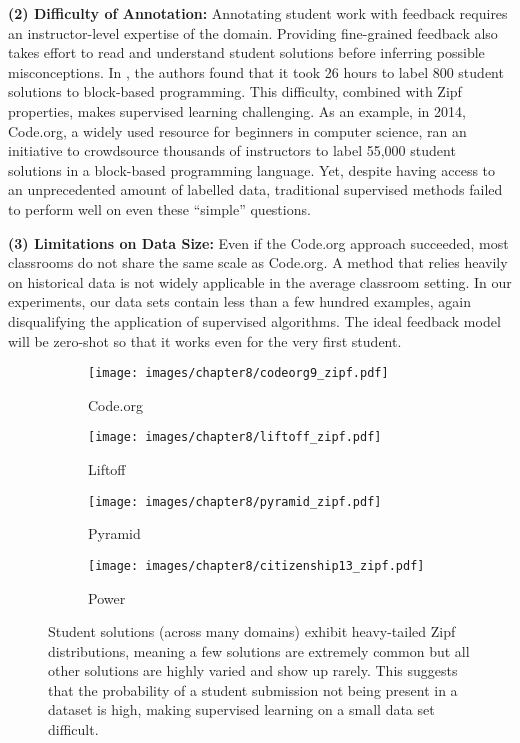 \noindent\textbf{(2) Difficulty of Annotation:} Annotating student work with feedback requires an instructor-level expertise of the domain. Providing fine-grained feedback also takes effort to read and understand student solutions before inferring possible misconceptions. In \cite{wu2018zero}, the authors found that it took 26 hours to label 800 student solutions to block-based programming.
This difficulty, combined with Zipf properties, makes supervised learning challenging. As an example, in 2014, Code.org, a widely used resource for beginners in computer science, ran an initiative to crowdsource thousands of instructors to label 55,000 student solutions in a block-based programming language. Yet, despite having access to an unprecedented amount of labelled data, traditional supervised methods failed to perform well on even these ``simple'' questions.\newline

\noindent\textbf{(3) Limitations on Data Size:} Even if the Code.org approach succeeded, most classrooms do not share the same scale as Code.org. A method that relies heavily on historical data is not widely applicable in the average classroom setting. In our experiments, our data sets contain less than a few hundred examples, again disqualifying the application of supervised algorithms. The ideal feedback model will be zero-shot so that it works even for the very first student.

\begin{figure}
    \centering
    \begin{subfigure}{0.24\linewidth}
        \centering
        \caption{Code.org}
        \texttt{[image: images/chapter8/codeorg9\_zipf.pdf]}
    \end{subfigure}
    \begin{subfigure}{0.24\linewidth}
        \centering
        \caption{Liftoff}
        \texttt{[image: images/chapter8/liftoff\_zipf.pdf]}
    \end{subfigure}
    \begin{subfigure}{0.24\linewidth}
        \centering
        \caption{Pyramid}
        \texttt{[image: images/chapter8/pyramid\_zipf.pdf]}
    \end{subfigure}
    \begin{subfigure}{0.24\linewidth}
        \centering
        \caption{Power}
        \texttt{[image: images/chapter8/citizenship13\_zipf.pdf]}
    \end{subfigure} 
    \caption{Student solutions (across many domains) exhibit heavy-tailed Zipf distributions, meaning a few solutions are extremely common but all other solutions are highly varied and show up rarely. This suggests that the probability of a student submission not being present in a dataset is high, making supervised learning on a small data set difficult. } 
    \label{fig:zipf}
\end{figure}

